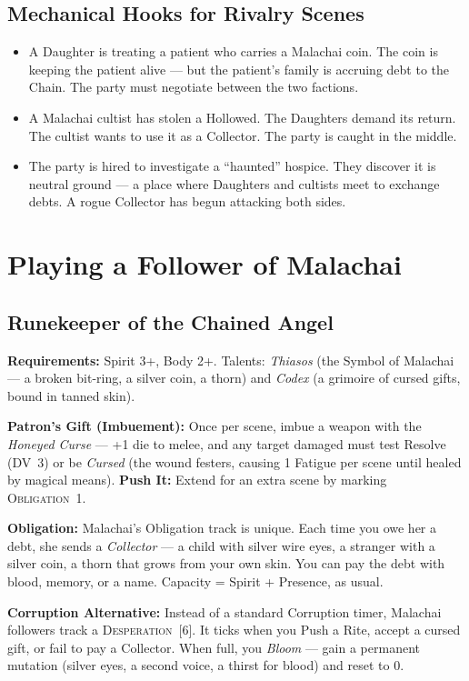 \documentclass[10pt,twoside]{book}
\newcommand{\dv}[1]{\textsc{DV}~#1}
\newcommand{\obligation}[1]{\textsc{Obligation}~#1}
\newcommand{\timer}[2]{\textsc{#1}~[#2]}
\begin{document}
\section{Mechanical Hooks for Rivalry Scenes}
\begin{itemize}
\item A Daughter is treating a patient who carries a Malachai coin. The coin is keeping the patient alive --- but the patient's family is accruing debt to the Chain. The party must negotiate between the two factions.
\item A Malachai cultist has stolen a Hollowed. The Daughters demand its return. The cultist wants to use it as a Collector. The party is caught in the middle.
\item The party is hired to investigate a ``haunted'' hospice. They discover it is neutral ground --- a place where Daughters and cultists meet to exchange debts. A rogue Collector has begun attacking both sides.
\end{itemize}

\chapter{Playing a Follower of Malachai}

\section{Runekeeper of the Chained Angel}

\textbf{Requirements:} Spirit 3+, Body 2+. Talents: \textit{Thiasos} (the Symbol of Malachai --- a broken bit-ring, a silver coin, a thorn) and \textit{Codex} (a grimoire of cursed gifts, bound in tanned skin).

\textbf{Patron's Gift (Imbuement):} Once per scene, imbue a weapon with the \textit{Honeyed Curse} --- +1 die to melee, and any target damaged must test Resolve (\dv{3}) or be \textit{Cursed} (the wound festers, causing 1 Fatigue per scene until healed by magical means). \textbf{Push It:} Extend for an extra scene by marking \obligation{1}.

\textbf{Obligation:} Malachai's Obligation track is unique. Each time you owe her a debt, she sends a \textit{Collector} --- a child with silver wire eyes, a stranger with a silver coin, a thorn that grows from your own skin. You can pay the debt with blood, memory, or a name. Capacity = Spirit + Presence, as usual.

\textbf{Corruption Alternative:} Instead of a standard Corruption timer, Malachai followers track a \timer{Desperation}{6}. It ticks when you Push a Rite, accept a cursed gift, or fail to pay a Collector. When full, you \textit{Bloom} --- gain a permanent mutation (silver eyes, a second voice, a thirst for blood) and reset to 0.
\end{document}

